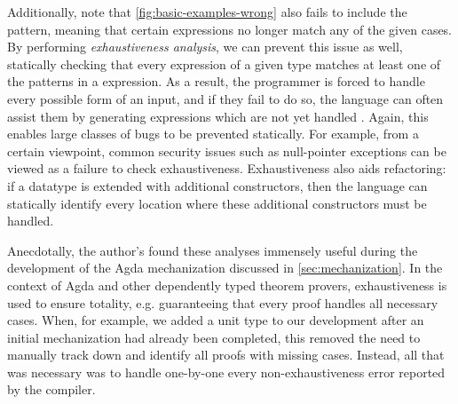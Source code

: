 Additionally, note that \autoref{fig:basic-examples-wrong} also fails to include the  pattern, meaning that certain expressions no longer match any of the given cases. By performing \emph{exhaustiveness analysis}, we can prevent this issue as well, statically checking that every expression of a given type matches at least one of the patterns in a  expression. As a result, the programmer is forced to handle every possible form of an input, and if they fail to do so, the language can often assist them by generating expressions which are not yet handled \cite{Harper2012}. Again, this enables large classes of bugs to be prevented statically. For example, from a certain viewpoint, common security issues such as null-pointer exceptions can be viewed as a failure to check exhaustiveness. Exhaustiveness also aids refactoring: if a datatype is extended with additional constructors, then the language can statically identify every location where these additional constructors must be handled. 

Anecdotally, the author's found these analyses immensely useful during the development of the Agda mechanization discussed in \autoref{sec:mechanization}. In the context of Agda and other dependently typed theorem provers, exhaustiveness is used to ensure totality, e.g. guaranteeing that every proof handles all necessary cases. When, for example, we added a unit type to our development after an initial mechanization had already been completed, this removed the need to manually track down and identify all proofs with missing cases. Instead, all that was necessary was to handle  one-by-one every non-exhaustiveness error reported by the compiler.